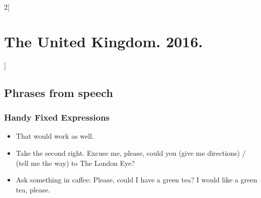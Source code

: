 \documentclass[10pt,a4paper]{article}
\newlength{\OriginalParIndent}
\newenvironment{ItemizeWithOrigParIndent}
    {\begin{itemize}[leftmargin=\OriginalParIndent]}
    {\end{itemize}}
\begin{document}
\begin{multicols}{2}[\section{The United Kingdom. 2016.}]

\subsection{Phrases from speech}

\subsubsection{Handy Fixed Expressions}
\begin{ItemizeWithOrigParIndent}
   \item That would work as well.
   \item Take the second right. Excuse me, please, could you (give me directions) /
   (tell me the way) to The London Eye?
   \item Ask something in caffee: Please, could I have a green tea? I would like a green tea, please.
\end{ItemizeWithOrigParIndent}



\end{multicols}
\end{document}

